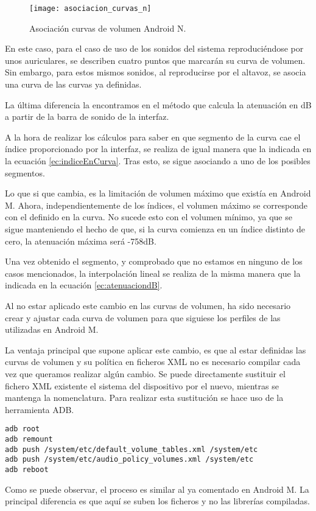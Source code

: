 \begin{figure}[H]
	\centering
	\texttt{[image: asociacion\_curvas\_n]}
	\caption{Asociación curvas de volumen Android N.}
	\label{fig:asociacion_curvas_n}
\end{figure}

En este caso, para el caso de uso de los sonidos del sistema reproduciéndose por unos auriculares, se describen cuatro puntos que marcarán su curva de volumen. Sin embargo, para estos mismos sonidos, al reproducirse por el altavoz, se asocia una curva de las curvas ya definidas.

La última diferencia la encontramos en el método que calcula la atenuación en \gls{dB} a partir de la barra de sonido de la interfaz.

A la hora de realizar los cálculos para saber en que segmento de la curva cae el índice proporcionado por la interfaz, se realiza de igual manera que la indicada en la ecuación \ref{ec:indiceEnCurva}. Tras esto, se sigue asociando a uno de los posibles segmentos.

Lo que si que cambia, es la limitación de volumen máximo que existía en Android M. Ahora, independientemente de los índices, el volumen máximo se corresponde con el definido en la curva. No sucede esto con el volumen mínimo, ya que se sigue manteniendo el hecho de que, si la curva comienza en un índice distinto de cero, la atenuación máxima será -758\gls{dB}.

Una vez obtenido el segmento, y comprobado que no estamos en ninguno de los casos mencionados, la interpolación lineal se realiza de la misma manera que la indicada en la ecuación \ref{ec:atenuaciondB}.

Al no estar aplicado este cambio en las curvas de volumen, ha sido necesario crear y ajustar cada curva de volumen para que siguiese los perfiles de las utilizadas en Android M. 

La ventaja principal que supone aplicar este cambio, es que al estar definidas las curvas de volumen y su política en ficheros XML no es necesario compilar cada vez que queramos realizar algún cambio. Se puede directamente sustituir el fichero XML existente el sistema del dispositivo por el nuevo, mientras se mantenga la nomenclatura. Para realizar esta sustitución se hace uso de la herramienta \gls{ADB}.
\\
\lstset{breaklines=true, basicstyle=\footnotesize}
\begin{lstlisting}[frame=single]
adb root
adb remount
adb push /system/etc/default_volume_tables.xml /system/etc
adb push /system/etc/audio_policy_volumes.xml /system/etc
adb reboot
\end{lstlisting}

Como se puede observar, el proceso es similar al ya comentado en Android M. La principal diferencia es que aquí se suben los ficheros y no las librerías compiladas.


